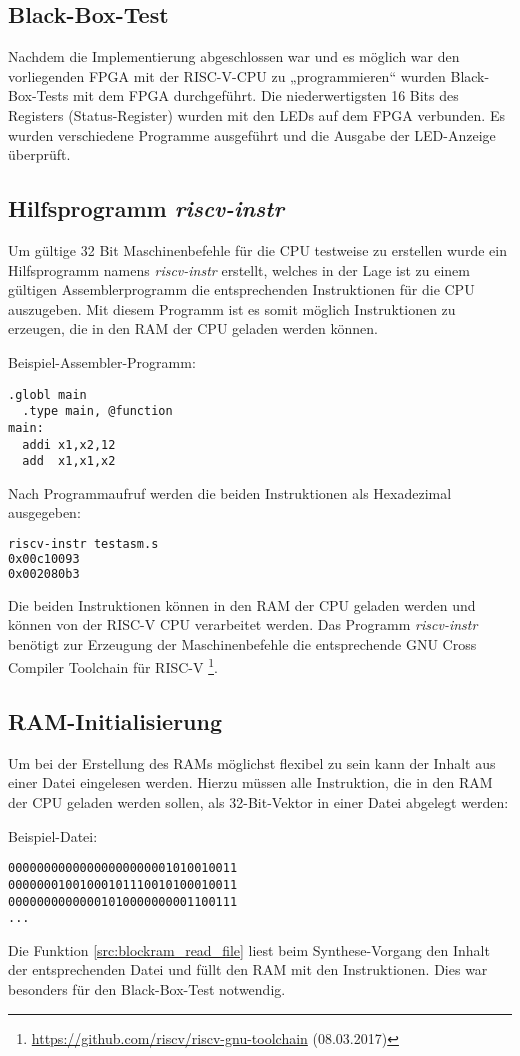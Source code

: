 \subsection{Black-Box-Test}
Nachdem die Implementierung abgeschlossen war und es möglich war den
vorliegenden FPGA mit der RISC-V-CPU zu „programmieren“ wurden
Black-Box-Tests mit dem FPGA durchgeführt. Die niederwertigsten 16 Bits
des Registers  (Status-Register) wurden mit den LEDs auf dem FPGA verbunden. Es
wurden verschiedene Programme ausgeführt und die Ausgabe der LED-Anzeige
überprüft.

\subsection{Hilfsprogramm \emph{riscv-instr}}
Um gültige 32 Bit Maschinenbefehle für die CPU testweise zu erstellen
wurde ein Hilfsprogramm namens \emph{riscv-instr} erstellt, welches in
der Lage ist zu einem gültigen Assemblerprogramm die entsprechenden
Instruktionen für die CPU auszugeben. Mit diesem Programm ist es somit
möglich Instruktionen zu erzeugen, die in den RAM der CPU geladen werden
können.

Beispiel-Assembler-Programm:
\begin{lstlisting}[language={[x86masm]Assembler}]
  .globl main
  .type main, @function
main:
  addi x1,x2,12 
  add  x1,x1,x2
\end{lstlisting}

Nach Programmaufruf werden die beiden Instruktionen als Hexadezimal
ausgegeben:
\begin{lstlisting}[language=bash]
riscv-instr testasm.s
0x00c10093 
0x002080b3 
\end{lstlisting}
Die beiden Instruktionen können in den RAM der CPU geladen werden und
können von der RISC-V CPU verarbeitet werden. Das Programm
\emph{riscv-instr} benötigt zur Erzeugung der Maschinenbefehle die 
entsprechende GNU Cross Compiler Toolchain für RISC-V
\footnote{\url{https://github.com/riscv/riscv-gnu-toolchain}
(08.03.2017)}. 

\subsection{RAM-Initialisierung}
Um bei der Erstellung des RAMs möglichst flexibel zu sein kann der
Inhalt aus einer Datei eingelesen werden. \cite[S. 187]{XST}
Hierzu müssen alle Instruktion, die in den RAM der CPU geladen werden
sollen, als 32-Bit-Vektor in einer Datei abgelegt werden:

Beispiel-Datei:
\begin{lstlisting}
00000000000000000000001010010011
00000001001000101110010100010011
00000000000001010000000001100111
...
\end{lstlisting}

Die Funktion \ref{src:blockram_read_file} liest beim Synthese-Vorgang
den Inhalt der entsprechenden Datei und füllt den RAM mit den
Instruktionen. Dies war besonders für den Black-Box-Test notwendig.
